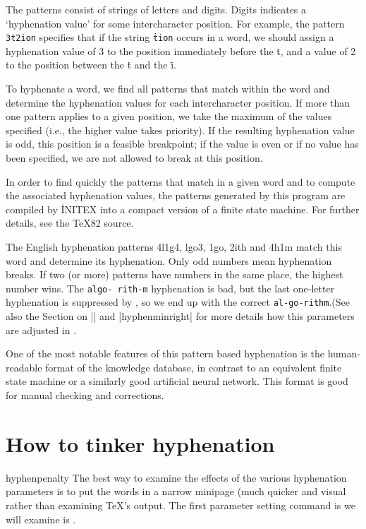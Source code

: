 The patterns consist of strings of letters and digits. Digits
indicates a `hyphenation value' for some intercharacter position.  For
example, the pattern \texttt{\.{3t2ion}} specifies that if the string \texttt{\.{tion}}
occurs in a word, we should assign a hyphenation value of 3 to the
position immediately before the \.{t}, and a value of 2 to the position
between the \.{t} and the \.{i}.

To hyphenate a word, we find all patterns that match within the word and
determine the hyphenation values for each intercharacter position.  If
more than one pattern applies to a given position, we take the maximum of
the values specified (i.e., the higher value takes priority).  If the
resulting hyphenation value is odd, this position is a feasible
breakpoint; if the value is even or if no value has been specified, we are
not allowed to break at this position.

In order to find quickly the patterns that match in a given word and to
compute the associated hyphenation values, the patterns generated by this
program are compiled by \.{INITEX} into a compact version of a finite
state machine.  For further details, see the \TeX 82 source.


The
\tex English hyphenation patterns 4l1g4, lgo3, 1go,
2ith and 4h1m match this word and determine its
hyphenation. Only odd numbers mean hyphenation
breaks. If two (or more) patterns have numbers in
the same place, the highest number wins. The \texttt{algo-
rith-m} hyphenation is bad, but the last one-letter
hyphenation is suppressed by \tex, so we end up with
the correct \texttt{al-go-rithm}.(See also the Section on |\hyphenminleft| and |hyphenminright| for more details
how this parameters are adjusted in \tex.

One of the most notable features of this pattern based
hyphenation is the human-readable format of
the knowledge database, in contrast to an equivalent
finite state machine or a similarly good artificial neural
network. This format is good for manual checking and
corrections.



\section*{How to tinker hyphenation}

\begin{macro}{hyphenpenalty}
The best way to examine the effects of the various hyphenation parameters
is to put the words in a narrow minipage (much quicker and visual rather than examining TeX's output. The first parameter setting command is we will examine is .
\end{macro}

